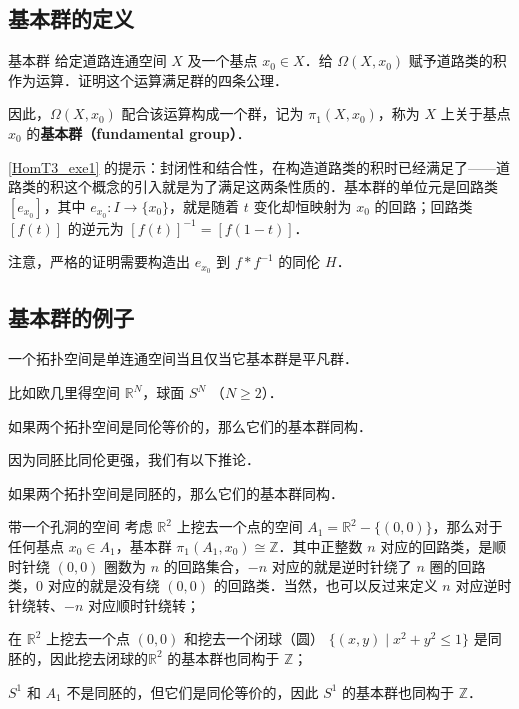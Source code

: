 \subsection{基本群的定义}

\begin{exercise}{基本群}\label{HomT3_exe1}
给定道路连通空间 $X$ 及一个基点 $x_0\in X$．给 $\Omega(X, x_0)$ 赋予道路类的积作为运算．证明这个运算满足群的四条公理．

因此，$\Omega(X, x_0)$ 配合该运算构成一个群，记为 $\pi_1(X, x_0)$，称为 $X$ 上关于基点 $x_0$ 的\textbf{基本群（fundamental group）}．
\end{exercise}

\autoref{HomT3_exe1} 的提示：封闭性和结合性，在构造道路类的积时已经满足了——道路类的积这个概念的引入就是为了满足这两条性质的．基本群的单位元是回路类 $[e_{x_0}]$，其中 $e_{x_0}: I\rightarrow\{x_0\}$，就是随着 $t$ 变化却恒映射为 $x_0$ 的回路；回路类 $[f(t)]$ 的逆元为 $[f(t)]^{-1}=[f(1-t)]$．

注意，严格的证明需要构造出 $e_{x_0}$ 到 $f*f^{-1}$ 的同伦 $H$．

\subsection{基本群的例子}

\begin{theorem}{}
一个拓扑空间是单连通空间当且仅当它基本群是平凡群．
\end{theorem}

比如欧几里得空间 $\mathbb{R}^N$，球面 $S^N$ （$N \geq 2$）．

\begin{theorem}{}
如果两个拓扑空间是同伦等价的，那么它们的基本群同构．
\end{theorem}

因为同胚比同伦更强，我们有以下推论．
\begin{corollary}{}
如果两个拓扑空间是同胚的，那么它们的基本群同构．
\end{corollary}

\begin{example}{带一个孔洞的空间}
考虑 $\mathbb{R}^2$ 上挖去一个点的空间 $A_1=\mathbb{R}^2-\{(0,0)\}$，那么对于任何基点 $x_0\in A_1$，基本群 $\pi_1(A_1, x_0) \cong \mathbb{Z}$．其中正整数 $n$ 对应的回路类，是顺时针绕 $(0,0)$ 圈数为 $n$ 的回路集合，$-n$ 对应的就是逆时针绕了 $n$ 圈的回路类，$0$ 对应的就是没有绕 $(0,0)$ 的回路类．当然，也可以反过来定义 $n$ 对应逆时针绕转、$-n$ 对应顺时针绕转；

在 $\mathbb{R}^2$ 上挖去一个点 $(0, 0)$ 和挖去一个闭球（圆） $\{(x, y) \mid  x^2 + y^2 \leq 1\}$ 是同胚的，因此挖去闭球的$\mathbb{R}^2$ 的基本群也同构于 $\mathbb{Z}$；

$S^1$ 和 $A_1$ 不是同胚的，但它们是同伦等价的，因此 $S^1$ 的基本群也同构于 $\mathbb{Z}$．
\end{example}

